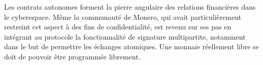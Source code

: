 Les contrats autonomes forment la pierre angulaire des relations financières dans le cyberespace. Même la communauté de Monero, qui avait particulièrement restreint cet aspect à des fins de confidentialité, est revenu sur ses pas en intégrant au protocole la fonctionnalité de signature multipartite, notamment dans le but de permettre les échanges atomiques. Une monnaie réellement libre se doit de pouvoir être programmée librement.